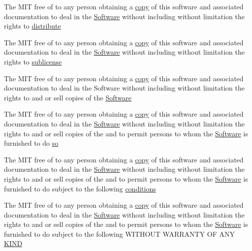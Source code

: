 \begin{DoxyCompactItemize}
\item 
The M\+I\+T free of to any person obtaining a \hyperlink{license_8txt_aff1d4c6b756ebf691fa44a0904f68658}{copy} of this software and associated documentation to deal in the \hyperlink{license_8txt_a22a1529885b3e9d66b0c72fe604fc3dc}{Software} without including without limitation the rights to \hyperlink{license_8txt_ad8444ae07f9fa7b3e3e0cf4dc4551114}{distribute}
\item 
The M\+I\+T free of to any person obtaining a \hyperlink{license_8txt_aff1d4c6b756ebf691fa44a0904f68658}{copy} of this software and associated documentation to deal in the \hyperlink{license_8txt_a22a1529885b3e9d66b0c72fe604fc3dc}{Software} without including without limitation the rights to \hyperlink{license_8txt_af9fad5470a0b4e968d19b11b7c643fdb}{sublicense}
\item 
The M\+I\+T free of to any person obtaining a \hyperlink{license_8txt_aff1d4c6b756ebf691fa44a0904f68658}{copy} of this software and associated documentation to deal in the Software without including without limitation the rights to and or sell copies of the \hyperlink{license_8txt_a22a1529885b3e9d66b0c72fe604fc3dc}{Software}
\item 
The M\+I\+T free of to any person obtaining a \hyperlink{license_8txt_aff1d4c6b756ebf691fa44a0904f68658}{copy} of this software and associated documentation to deal in the \hyperlink{license_8txt_a22a1529885b3e9d66b0c72fe604fc3dc}{Software} without including without limitation the rights to and or sell copies of the and to permit persons to whom the \hyperlink{license_8txt_a22a1529885b3e9d66b0c72fe604fc3dc}{Software} is furnished to do \hyperlink{license_8txt_ab05c0f0392781fce452b91e1ede41d90}{so}
\item 
The M\+I\+T free of to any person obtaining a \hyperlink{license_8txt_aff1d4c6b756ebf691fa44a0904f68658}{copy} of this software and associated documentation to deal in the \hyperlink{license_8txt_a22a1529885b3e9d66b0c72fe604fc3dc}{Software} without including without limitation the rights to and or sell copies of the and to permit persons to whom the \hyperlink{license_8txt_a22a1529885b3e9d66b0c72fe604fc3dc}{Software} is furnished to do subject to the following \hyperlink{license_8txt_a9519688b6bdbbccdcec5fef05966b25b}{conditions}
\item 
The M\+I\+T free of to any person obtaining a \hyperlink{license_8txt_aff1d4c6b756ebf691fa44a0904f68658}{copy} of this software and associated documentation to deal in the \hyperlink{license_8txt_a22a1529885b3e9d66b0c72fe604fc3dc}{Software} without including without limitation the rights to and or sell copies of the and to permit persons to whom the \hyperlink{license_8txt_a22a1529885b3e9d66b0c72fe604fc3dc}{Software} is furnished to do subject to the following W\+I\+T\+H\+O\+U\+T W\+A\+R\+R\+A\+N\+T\+Y O\+F A\+N\+Y \hyperlink{license_8txt_a8e1a82be600178fe97c0e1339897c260}{K\+I\+N\+D}

\end{DoxyCompactItemize}
